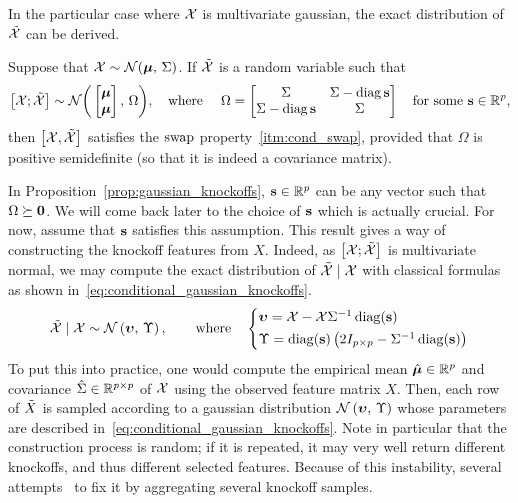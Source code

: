 In the particular case where $\mathcal{X}$ is multivariate gaussian, the exact distribution of $\tilde{\mathcal{X}}$ can be derived.
\begin{proposition}
    \label{prop:gaussian_knockoffs}
    Suppose that $\mathcal{X} \sim \mathcal{N}(\bm{\mu},\, \Sigma)$.
    If $\tilde{\mathcal{X}}$ is a random variable such that
    \begin{equation*}
        \big[ \mathcal{X}; \tilde{\mathcal{X}} \big] \sim \mathcal{N}\bigg(\begin{bmatrix} \bm{\mu}\\ \bm{\mu} \end{bmatrix},\, \Omega\bigg)
        ,\quad\text{where }\quad
        \Omega = \begin{bmatrix}
            \Sigma & \Sigma - \operatorname*{diag} \mathbf{s}\\
            \Sigma - \operatorname*{diag} \mathbf{s} & \Sigma
        \end{bmatrix}
        \quad\text{for some }
        \mathbf{s} \in \mathbb{R}^p,
    \end{equation*}
    then $\big[\mathcal{X}, \tilde{\mathcal{X}} \big]$ satisfies the $\operatorname{swap}$ property~\ref{itm:cond_swap},
    provided that $\Omega$ is positive semidefinite (so that it is indeed a covariance matrix).
\end{proposition}
In Proposition~\ref{prop:gaussian_knockoffs},
$\mathbf{s} \in \mathbb{R}^p$ can be any vector such that $\Omega \succeq \mathbf{0}$.
We will come back later to the choice of $\mathbf{s}$ which is actually crucial.
For now, assume that $\mathbf{s}$ satisfies this assumption.
This result gives a way of constructing the knockoff features from $X$.
Indeed, as $\big[ \mathcal{X}; \tilde{\mathcal{X}} \big]$ is multivariate normal, we may compute the exact distribution of
$\tilde{\mathcal{X}} \mid \mathcal{X}$ with classical formulas~\cite{conditional_normal} as shown in~\ref{eq:conditional_gaussian_knockoffs}.
\begin{equation}\label{eq:conditional_gaussian_knockoffs}
    \tcX \mid \cX \sim \cN\left( \bupsilon,\, \Upsilon \right)
    ,\qquad\text{where}\quad
    \begin{cases*}
        \bupsilon = \cX - \cX\Sigma^{-1}\diag(\bs)\\
        \Upsilon = \diag(\bs)\left( 2I_{p \times p} - \Sigma^{-1}\diag(\bs) \right)
    \end{cases*}
\end{equation}
To put this into practice, one would compute the empirical mean
$\hat{\bm{\mu}} \in \mathbb{R}^p$ and covariance $\hat{\Sigma} \in \mathbb{R}^{p \times p}$ of $\mathcal{X}$
using the observed feature matrix $X$.
Then, each row of $\tilde{X}$ is sampled according to a gaussian distribution $\mathcal{N}\left( \bm{\upsilon},\, \Upsilon \right)$
whose parameters are described in~\ref{eq:conditional_gaussian_knockoffs}.
Note in particular that the construction process is random;
if it is repeated, it may very well return different knockoffs, and thus different
selected features.
Because of this instability, several attempts~\cite{improve_stability_knockoffs} to fix it by
aggregating several knockoff samples.

